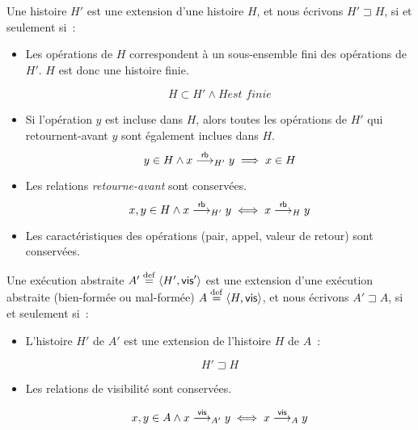 \begin{definition}\label{def:hist-ext}
Une histoire $H'$ est une extension d'une histoire $H$, et nous écrivons $H' \sqsupset H$, si et seulement si~:
\begin{itemize}
  \item Les opérations de $H$ correspondent à un sous-ensemble fini des opérations de $H'$. $H$ est donc une histoire finie.

  \begin{equation*}
    H \subset H' \land H \textit{est finie}
  \end{equation*}

  \item Si l'opération $y$ est incluse dans $H$, alors toutes les opérations de $H'$ qui retournent-avant $y$ sont également inclues dans $H$.
  \begin{equation*}
    y \in H \land x \rb_{H'} y \implies x \in H
  \end{equation*}
  
  \item Les relations \emph{retourne-avant} sont conservées.
  \begin{equation*}
    x, y \in H \land x \rb_{H'} y \iff x \rb_{H} y
  \end{equation*}
  
  \item Les caractéristiques des opérations (pair, appel, valeur de retour) sont conservées.
\end{itemize}
\end{definition}


\begin{definition}\label{def:wf-abstract-exec-prefix}
Une exécution abstraite $A' \defeq \tuple*{H',\trm{vis}'}$ est une extension d'une exécution abstraite (bien-formée ou mal-formée) $A \defeq \tuple*{H,\trm{vis}}$, et nous écrivons $A' \sqsupset A$, si et seulement si~:
\begin{itemize}
  \item L'histoire $H'$ de $A'$ est une extension de l'histoire $H$ de $A$~:

  \begin{equation*}
    H' \sqsupset H
  \end{equation*}

  \item Les relations de visibilité sont conservées.

  \begin{equation*}
    x, y \in A \land x \vis_{A'} y \iff x \vis_{A} y
  \end{equation*}
\end{itemize}
\end{definition}


